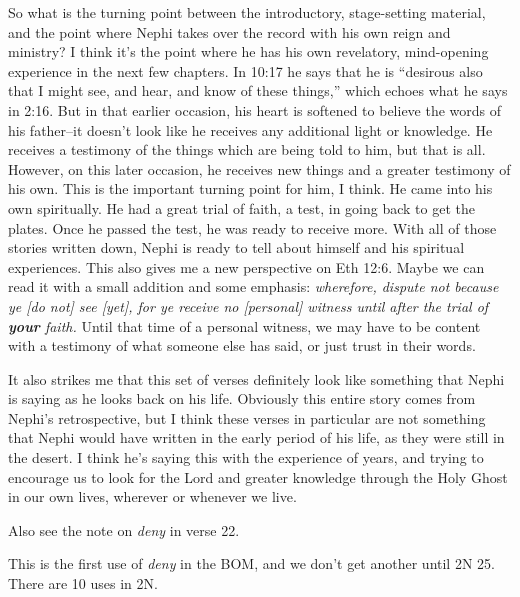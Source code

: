 		So what is the turning point between the introductory, stage-setting material, and the point where Nephi takes over the record with his own reign and ministry? I think it's the point where he has his own revelatory, mind-opening experience in the next few chapters. In 10:17 he says that he is ``desirous also that I might see, and hear, and know of these things,'' which echoes what he says in 2:16. But in that earlier occasion, his heart is softened to believe the words of his father--it doesn't look like he receives any additional light or knowledge. He receives a testimony of the things which are being told to him, but that is all. However, on this later occasion, he receives new things and a greater testimony of his own. This is the important turning point for him, I think. He came into his own spiritually. He had a great trial of faith, a test, in going back to get the plates. Once he passed the test, he was ready to receive more. With all of those stories written down, Nephi is ready to tell about himself and his spiritual experiences. This also gives me a new perspective on Eth 12:6. Maybe we can read it with a small addition and some emphasis: \textit{wherefore, dispute not because ye [do not] see [yet], for ye receive no [personal] witness until after the trial of \textbf{your} faith.} Until that time of a personal witness, we may have to be content with a testimony of what someone else has said, or just trust in their words.

		\begin{compactdesc}

		\item[17--22$\vert$]
		\begin{compactdesc}
		\item[Retrospective?] It also strikes me that this set of verses definitely look like something that Nephi is saying as he looks back on his life. Obviously this entire story comes from Nephi's retrospective, but I think these verses in particular are not something that Nephi would have written in the early period of his life, as they were still in the desert. I think he's saying this with the experience of years, and trying to encourage us to look for the Lord and greater knowledge through the Holy Ghost in our own lives, wherever or whenever we live.

		Also see the note on \textit{deny} in verse 22.
		\end{compactdesc}

		\item[23$\vert$]
		\begin{compactdesc}
		\item[deny] This is the first use of \textit{deny} in the BOM, and we don't get another until 2N 25. There are 10 uses in 2N.
		\end{compactdesc}

		\end{compactdesc}
		
